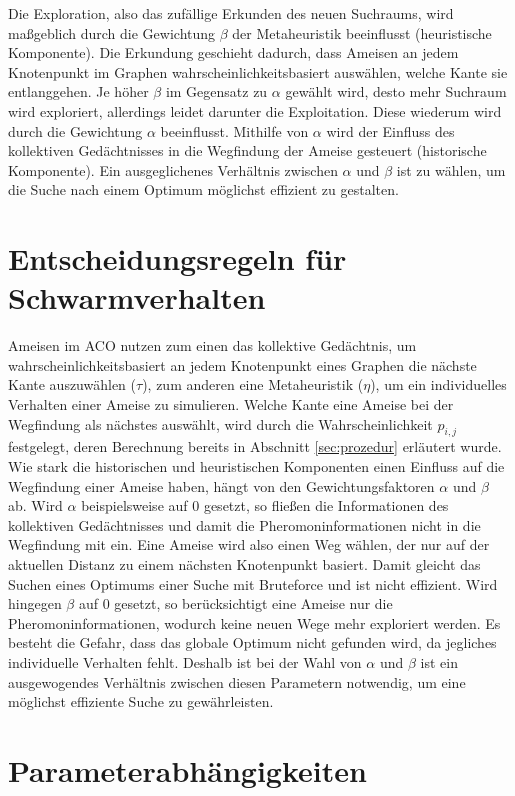 Die Exploration, also das zufällige Erkunden des neuen 
Suchraums, wird maßgeblich durch die Gewichtung $\beta$ der Metaheuristik 
beeinflusst (heuristische Komponente). Die Erkundung geschieht dadurch,
dass Ameisen an jedem Knotenpunkt im Graphen wahrscheinlichkeitsbasiert
auswählen, welche Kante sie entlanggehen. 
Je höher $\beta$ im Gegensatz zu $\alpha$ gewählt wird, desto mehr Suchraum wird 
exploriert, allerdings leidet darunter die Exploitation.
Diese wiederum wird durch die Gewichtung $\alpha$ beeinflusst. Mithilfe
von $\alpha$ wird der Einfluss des kollektiven Gedächtnisses in die Wegfindung
der Ameise gesteuert (historische Komponente).
Ein ausgeglichenes Verhältnis zwischen $\alpha$ und $\beta$ ist zu wählen, um
die Suche nach einem Optimum möglichst effizient zu gestalten.

\section{Entscheidungsregeln für Schwarmverhalten}

Ameisen im ACO nutzen zum einen das kollektive Gedächtnis, um
wahrscheinlichkeitsbasiert an jedem Knotenpunkt eines Graphen die nächste
Kante auszuwählen ($\tau$), zum anderen eine Metaheuristik ($\eta$), um ein
individuelles Verhalten einer Ameise zu simulieren.
Welche Kante eine Ameise bei der Wegfindung als nächstes auswählt, wird
durch die Wahrscheinlichkeit $p_{i,j}$ festgelegt, deren Berechnung bereits
in Abschnitt \ref{sec:prozedur} erläutert wurde.
Wie stark die historischen und heuristischen Komponenten einen Einfluss auf
die Wegfindung einer Ameise haben, hängt von
den Gewichtungsfaktoren $\alpha$ und $\beta$ ab. Wird $\alpha$ beispielsweise
auf 0 gesetzt, so fließen die Informationen des kollektiven Gedächtnisses und
damit die Pheromoninformationen nicht in die Wegfindung mit ein. Eine Ameise
wird also einen Weg wählen, der nur auf der aktuellen Distanz zu einem nächsten
Knotenpunkt basiert. Damit gleicht das Suchen eines Optimums einer Suche mit
Bruteforce und ist nicht effizient. Wird hingegen $\beta$ auf 0 gesetzt, so
berücksichtigt eine Ameise nur die Pheromoninformationen, wodurch keine neuen
Wege mehr exploriert werden. Es besteht die Gefahr, dass das globale Optimum
nicht gefunden wird, da jegliches individuelle Verhalten fehlt.
Deshalb ist bei der Wahl von $\alpha$ und $\beta$ ist ein ausgewogendes
Verhältnis zwischen diesen Parametern notwendig, um eine möglichst effiziente
Suche zu gewährleisten.

\section{Parameterabhängigkeiten}

